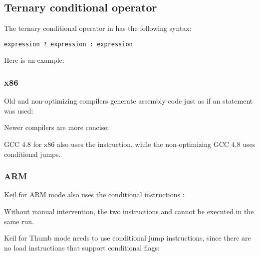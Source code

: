 \subsection{Ternary conditional operator}
\label{chap:cond}

The ternary conditional operator in \CCpp has the following syntax:

\begin{lstlisting}
expression ? expression : expression
\end{lstlisting}

Here is an example:



\subsubsection{x86}

Old and non-optimizing compilers generate assembly code just as if an  statement was used:





Newer compilers are more concise:



\Optimizing GCC 4.8 for x86 also uses the  instruction, while the non-optimizing GCC 4.8 uses conditional jumps.

\subsubsection{ARM}

\Optimizing Keil for ARM mode also uses the conditional instructions :



Without manual intervention, the two instructions  and  cannot be executed in the same run.

\Optimizing Keil for Thumb mode needs to use conditional jump instructions, since there are no load instructions
that support conditional flags:

